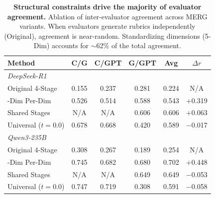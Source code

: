 \begin{table}[t]
\centering
\caption{\textbf{Structural constraints drive the majority of evaluator agreement.} Ablation of inter-evaluator agreement across MERG variants. When evaluators generate rubrics independently (Original), agreement is near-random. Standardizing dimensions (5-Dim) accounts for $\sim$62\% of the total agreement.}
\label{tab:ablation}
\small
\begin{tabular}{lccccc}
\toprule
Method & C/G & C/GPT & G/GPT & Avg & $\Delta r$ \\
\midrule
\multicolumn{6}{l}{\textit{DeepSeek-R1}} \\
\quad Original 4-Stage & 0.155 & 0.237 & 0.281 & 0.224 & {N/A} \\
\quad 5-Dim Per-Dim & 0.526 & 0.514 & 0.588 & 0.543 & $+$0.319 \\
\quad Shared Stages & {N/A} & {N/A} & 0.606 & 0.606 & $+$0.063 \\
\quad Universal ($t{=}0.0$) & 0.678 & 0.668 & 0.420 & 0.589 & $-$0.017 \\
\midrule
\multicolumn{6}{l}{\textit{Qwen3-235B}} \\
\quad Original 4-Stage & 0.308 & 0.267 & 0.189 & 0.254 & {N/A} \\
\quad 5-Dim Per-Dim & 0.745 & 0.682 & 0.680 & 0.702 & $+$0.448 \\
\quad Shared Stages & {N/A} & {N/A} & 0.649 & 0.649 & $-$0.053 \\
\quad Universal ($t{=}0.0$) & 0.747 & 0.719 & 0.308 & 0.591 & $-$0.058 \\
\bottomrule
\end{tabular}
\end{table}
